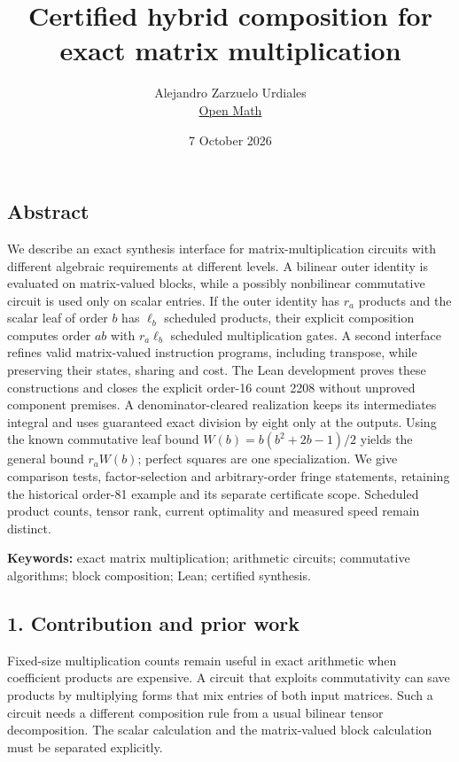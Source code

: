 \documentclass[
  11pt,
]{article}
\title{Certified hybrid composition for exact matrix multiplication}
\author{Alejandro Zarzuelo Urdiales\\[3pt]\small\href{https://rsihouse.ai/openmath}{Open Math}}
\date{7 October 2026}
\begin{document}
\maketitle

\subsection{Abstract}\label{abstract}

We describe an exact synthesis interface for matrix-multiplication
circuits with different algebraic requirements at different levels. A
bilinear outer identity is evaluated on matrix-valued blocks, while a
possibly nonbilinear commutative circuit is used only on scalar entries.
If the outer identity has \(r_a\) products and the scalar leaf of order
\(b\) has \(\ell_b\) scheduled products, their explicit composition
computes order \(ab\) with \(r_a\ell_b\) scheduled multiplication gates.
A second interface refines valid matrix-valued instruction programs,
including transpose, while preserving their states, sharing and cost.
The Lean development proves these constructions and closes the explicit
order-16 count 2208 without unproved component premises. A
denominator-cleared realization keeps its intermediates integral and
uses guaranteed exact division by eight only at the outputs. Using the
known commutative leaf bound \(W(b)=b(b^2+2b-1)/2\) yields the general
bound \(r_aW(b)\); perfect squares are one specialization. We give
comparison tests, factor-selection and arbitrary-order fringe
statements, retaining the historical order-81 example and its separate
certificate scope. Scheduled product counts, tensor rank, current
optimality and measured speed remain distinct.

\textbf{Keywords:} exact matrix multiplication; arithmetic circuits;
commutative algorithms; block composition; Lean; certified synthesis.

\subsection{1. Contribution and prior
work}\label{contribution-and-prior-work}

Fixed-size multiplication counts remain useful in exact arithmetic when
coefficient products are expensive. A circuit that exploits
commutativity can save products by multiplying forms that mix entries of
both input matrices. Such a circuit needs a different composition rule
from a usual bilinear tensor decomposition. The scalar calculation and
the matrix-valued block calculation must be separated explicitly.
\end{document}
